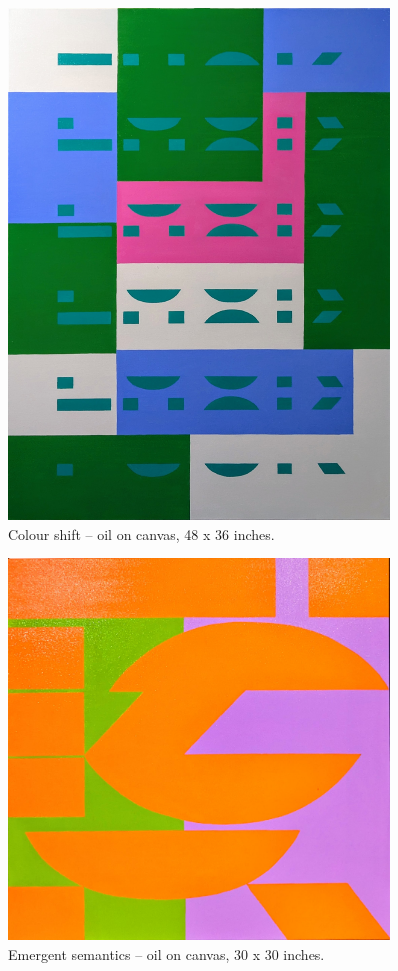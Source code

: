 \documentclass[12pt]{article}
\begin{document}
\begin{figure}[htbp]
  \centering
  \includegraphics*[width=0.9\textwidth]{green.jpg}
  \caption{Colour shift -- oil on canvas, 48 x 36 inches.}
  \label{fig:green}
\end{figure}

\begin{figure}[htbp]
  \centering
  \includegraphics*[width=0.9\textwidth]{orange.jpg}
  \caption{Emergent semantics -- oil on canvas, 30 x 30 inches.}
  \label{fig:orange}
\end{figure}

\newpage


\end{document}

